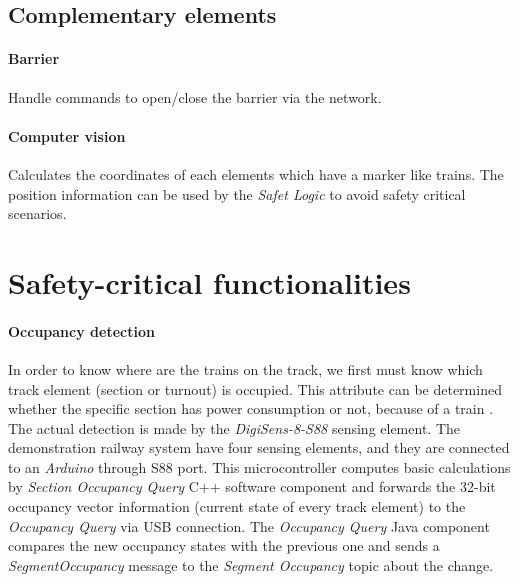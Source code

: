 \subsection{Complementary elements}
\paragraph{Barrier} 
Handle commands to open/close the barrier via the network.
\paragraph{Computer vision}
Calculates the coordinates of each elements which have a marker like trains. The position information can be used by the \textit{Safet Logic} to avoid safety critical scenarios.

\section{Safety-critical functionalities}\label{section:SC-Functionalities}


\paragraph{Occupancy detection}\label{par:FunctionOccupancyDetection}
In order to know where are the trains on the track, we first must know which track element (section or turnout) is occupied. This attribute can be determined whether the specific section has power consumption or not, because of a train . The actual detection is made by the \textit{DigiSens-8-S88} sensing element. The demonstration railway system have four sensing elements, and they are connected to an \textit{Arduino} through S88 port. This microcontroller computes basic calculations by \textit{Section Occupancy Query} C++ software component and forwards the 32-bit occupancy vector information (current state of every track element) to the \textit{Occupancy Query} via USB connection. The \textit{Occupancy Query} Java component compares the new occupancy states with the previous one and sends a \textit{SegmentOccupancy} message to the \textit{Segment Occupancy} topic about the change.

